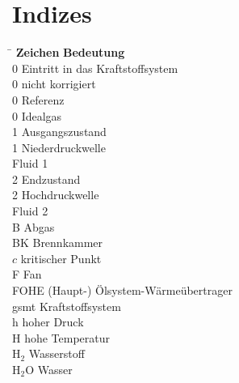 \section*{Indizes}

\begin{tabbing}
	\hspace*{3cm} \= \hspace*{8cm} \kill
	\textbf{Zeichen} \> \textbf{Bedeutung} 							\\[5mm]
	0		\>	Eintritt in das Kraftstoffsystem					\\
    0		\>	nicht korrigiert					                \\
    0       \>  Referenz 						                    \\
    0       \>  Idealgas                                            \\
	1		\>	Ausgangszustand                                     \\
    1       \>  Niederdruckwelle                                    \\
     \> Fluid 1                                              \\
	2		\>	Endzustand								            \\
    2       \>  Hochdruckwelle                                      \\
     \> Fluid 2                                              \\
    B       \>  Abgas                                               \\
    BK      \>  Brennkammer                                         \\
    $c$     \>  kritischer Punkt                                    \\
    F       \>  Fan                                                 \\
    FOHE    \>  (Haupt-) Ölsystem-Wärmeübertrager                   \\
    gsmt    \>  Kraftstoffsystem                                    \\
    h       \>  hoher Druck                                         \\
    H       \>  hohe Temperatur                                     \\
    H$_2$   \>  Wasserstoff                                         \\
    H$_2$O  \>  Wasser                                              \\

\end{tabbing}
